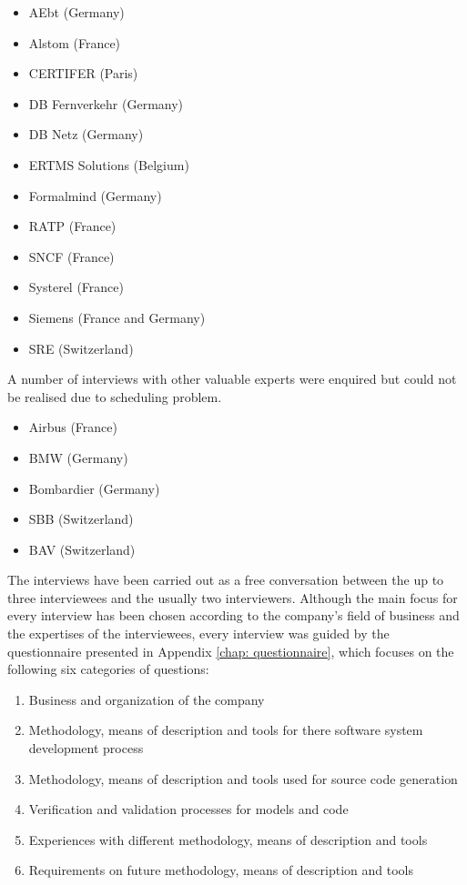 \documentclass{./template/openetcs_report}
\begin{document}
\vspace{-10pt}
\begin{itemize}[topsep=2pt, partopsep=2pt,itemsep=2pt,parsep=2pt]
  \item AEbt (Germany)
  \item Alstom (France)  
  \item CERTIFER (Paris)
  \item DB Fernverkehr (Germany)
  \item DB Netz (Germany)
  \item ERTMS Solutions (Belgium)
  \item Formalmind (Germany)
  \item RATP (France)
  \item SNCF (France)
  \item Systerel (France)
  \item Siemens (France and Germany)
  \item SRE (Switzerland)
\end{itemize}

A number of interviews with other valuable experts were enquired but could not be realised due to scheduling problem.


\vspace{-10pt}
\begin{itemize} [topsep=2pt, partopsep=2pt,itemsep=2pt,parsep=2pt]
  \item Airbus (France)
  \item BMW (Germany)
  \item Bombardier (Germany)
  \item SBB (Switzerland)
  \item BAV (Switzerland)
\end{itemize}

The interviews have been carried out as a free conversation between the up to three interviewees and the usually two interviewers. Although the main focus for every interview has been chosen according to the company's field of business and the expertises of the interviewees, every interview was guided by the questionnaire presented in Appendix \ref{chap: questionnaire}, which focuses on the following six categories of questions:

\vspace{-10pt}
\begin{enumerate}[topsep=2pt, partopsep=2pt,itemsep=2pt,parsep=2pt]

	\renewcommand{\theenumi}{\Alph{enumi}}
	\renewcommand{\labelenumi}{\theenumi}

  \item Business and organization of the company
  \item Methodology, means of description and tools for there software system development process
  \item Methodology, means of description and tools used for source code generation
  \item Verification and validation processes for models and code
  \item Experiences with different methodology, means of description and tools
  \item Requirements on future methodology, means of description and tools
\end{enumerate}
\end{document}
